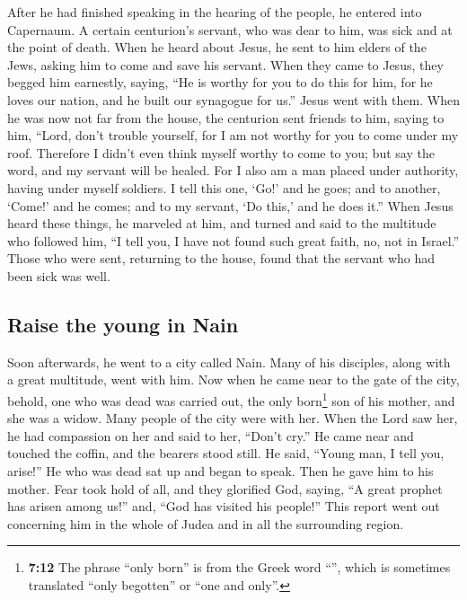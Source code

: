 \begin{paracol}{2}
\begin{otherlanguage}{english}
 After he had finished speaking in the hearing of the
people, he entered into Capernaum.  A certain centurion's
servant, who was dear to him, was sick and at the point of death.
 When he heard about Jesus, he sent to him elders of the
Jews, asking him to come and save his servant.  When they
came to Jesus, they begged him earnestly, saying, ``He is worthy for you
to do this for him,  for he loves our nation, and he built
our synagogue for us.''  Jesus went with them. When he was
now not far from the house, the centurion sent friends to him, saying to
him, ``Lord, don't trouble yourself, for I am not worthy for you to come
under my roof.  Therefore I didn't even think myself
worthy to come to you; but say the word, and my servant will be healed.
 For I also am a man placed under authority, having under
myself soldiers. I tell this one, `Go!' and he goes; and to another,
`Come!' and he comes; and to my servant, `Do this,' and he does it.''
 When Jesus heard these things, he marveled at him, and
turned and said to the multitude who followed him, ``I tell you, I have
not found such great faith, no, not in Israel.''  Those
who were sent, returning to the house, found that the servant who had
been sick was well.

\hypertarget{raise-the-young-in-nain}{%
\subsection{Raise the young in Nain}\label{raise-the-young-in-nain}}

 Soon afterwards, he went to a city called Nain. Many of
his disciples, along with a great multitude, went with him.
 Now when he came near to the gate of the city, behold,
one who was dead was carried out, the only born\footnote{\textbf{7:12}
  The phrase ``only born'' is from the Greek word ``'',
  which is sometimes translated ``only begotten'' or ``one and only''.}
son of his mother, and she was a widow. Many people of the city were
with her.  When the Lord saw her, he had compassion on
her and said to her, ``Don't cry.''  He came near and
touched the coffin, and the bearers stood still. He said, ``Young man, I
tell you, arise!''  He who was dead sat up and began to
speak. Then he gave him to his mother.  Fear took hold of
all, and they glorified God, saying, ``A great prophet has arisen among
us!'' and, ``God has visited his people!''  This report
went out concerning him in the whole of Judea and in all the surrounding
region.


\end{otherlanguage}
\end{paracol}
